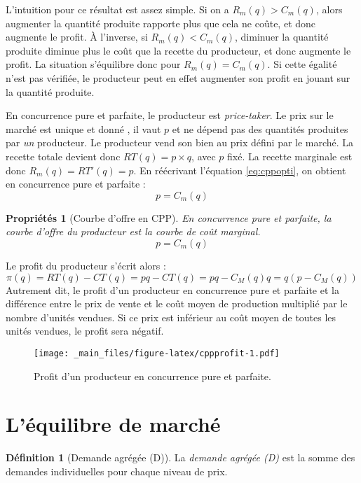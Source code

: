 \documentclass[
]{book}
\newtheorem{proposition}{Propriétés}[chapter]
\theoremstyle{definition}
\newtheorem{definition}{Définition}[chapter]
\theoremstyle{definition}
\theoremstyle{definition}
\theoremstyle{definition}
\theoremstyle{remark}
\begin{document}
L'intuition pour ce résultat est assez simple.
Si on a \(R_m(q)>C_m(q)\), alors augmenter la quantité produite rapporte plus que cela ne coûte, et donc augmente le profit.
À l'inverse, si \(R_m(q)<C_m(q)\), diminuer la quantité produite diminue plus le coût que la recette du producteur, et donc augmente le profit.
La situation s'équilibre donc pour \(R_m(q)=C_m(q)\).
Si cette égalité n'est pas vérifiée, le producteur peut en effet augmenter son profit en jouant sur la quantité produite.

En concurrence pure et parfaite, le producteur est \emph{price-taker}.
Le prix sur le marché est unique et donné , il vaut \(p\) et ne dépend pas des quantités produites par \emph{un} producteur.
Le producteur vend son bien au prix défini par le marché.
La recette totale devient donc \(RT(q)=p\times q\), avec \(p\) fixé.
La recette marginale est donc \(R_m(q)=RT'(q)=p\).
En réécrivant l'équation \eqref{eq:cppopti}, on obtient en concurrence pure et parfaite :
\[p=C_m(q)\]

\begin{proposition}[Courbe d'offre en CPP]
En concurrence pure et parfaite, la courbe d'offre du producteur est la courbe de coût marginal.
\[p=C_m(q)\]
\end{proposition}

Le profit du producteur s'écrit alors :
\[\pi(q)=RT(q)-CT(q)=pq-CT(q)=pq-C_M(q)q=q(p-C_M(q))\]
Autrement dit, le profit d'un producteur en concurrence pure et parfaite et la différence entre le prix de vente et le coût moyen de production multiplié par le nombre d'unités vendues.
Si ce prix est inférieur au coût moyen de toutes les unités vendues, le profit sera négatif.

\begin{figure}
\centering
\texttt{[image: \_main\_files/figure-latex/cppprofit-1.pdf]}
\caption{\label{fig:cppprofit}Profit d'un producteur en concurrence pure et parfaite.}
\end{figure}

\hypertarget{luxe9quilibre-de-marchuxe9}{%
\section{L'équilibre de marché}\label{luxe9quilibre-de-marchuxe9}}

\begin{definition}[Demande agrégée (D)]
La \emph{demande agrégée (D)} est la somme des demandes individuelles pour chaque niveau de prix.
\end{definition}
\end{document}
